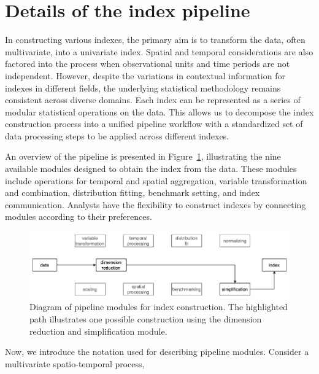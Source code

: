 \documentclass[
]{interact}
\begin{document}
\hypertarget{sec-pipeline}{%
\section{Details of the index pipeline}\label{sec-pipeline}}

In constructing various indexes, the primary aim is to transform the
data, often multivariate, into a univariate index. Spatial and temporal
considerations are also factored into the process when observational
units and time periods are not independent. However, despite the
variations in contextual information for indexes in different fields,
the underlying statistical methodology remains consistent across diverse
domains. Each index can be represented as a series of modular
statistical operations on the data. This allows us to decompose the
index construction process into a unified pipeline workflow with a
standardized set of data processing steps to be applied across different
indexes.

An overview of the pipeline is presented in
Figure~\ref{fig-pipeline-steps}, illustrating the nine available modules
designed to obtain the index from the data. These modules include
operations for temporal and spatial aggregation, variable transformation
and combination, distribution fitting, benchmark setting, and index
communication. Analysts have the flexibility to construct indexes by
connecting modules according to their preferences.

\begin{figure}

{\centering \includegraphics[width=1\textwidth,height=0.9\textheight]{figures/pipeline-overall.png}

}

\caption{\label{fig-pipeline-steps}Diagram of pipeline modules for index
construction. The highlighted path illustrates one possible construction
using the dimension reduction and simplification module.}

\end{figure}

Now, we introduce the notation used for describing pipeline modules.
Consider a multivariate spatio-temporal process,
\end{document}
